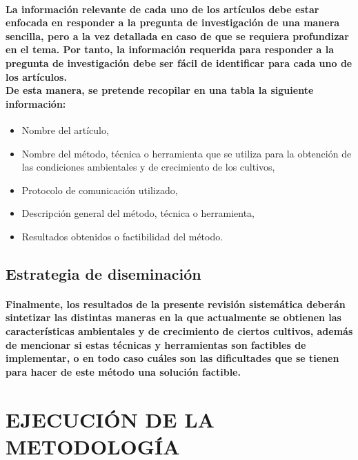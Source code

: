 \documentclass[10pt, twocolumn]{article}
\begin{document}
\paragraph{La información relevante de cada uno de los artículos debe estar enfocada en responder a la pregunta de investigación de una manera sencilla, pero a la vez detallada en caso de que se requiera profundizar en el tema. Por tanto, la información requerida para responder a la pregunta de investigación debe ser fácil de identificar para cada uno de los artículos. \\ De esta manera, se pretende recopilar en una tabla la siguiente información:}
\begin{itemize}
	\item{Nombre del artículo,}
	\item{Nombre del método, técnica o herramienta que se utiliza para la obtención de las condiciones ambientales y de crecimiento de los cultivos,}
	\item{Protocolo de comunicación utilizado,}
	\item{Descripción general del método, técnica o herramienta,}
	\item{Resultados obtenidos o factibilidad del método.}
\end{itemize}

\subsection{Estrategia de diseminación}
\paragraph{Finalmente, los resultados de la presente revisión sistemática deberán sintetizar las distintas maneras en la que actualmente se obtienen las características ambientales y de crecimiento de ciertos cultivos, además de mencionar si estas técnicas y herramientas son factibles de implementar, o en todo caso cuáles son las dificultades que se tienen para hacer de este método una solución factible.}

\section{EJECUCIÓN DE LA METODOLOGÍA}
\end{document}
